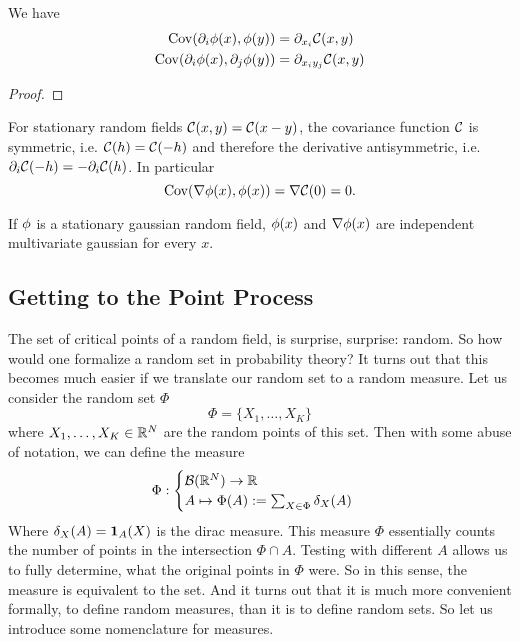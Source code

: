 \begin{lemma}
	\label{lem: covariance of derivative}
	We have
	\begin{align*}
		\operatorname{Cov}(\partial_i\phi(x), \phi(y)) &= \partial_{x_i} \mathcal{C}(x,y)\\
		\operatorname{Cov}(\partial_i\phi(x), \partial_j \phi(y)) &= \partial_{x_i y_j} \mathcal{C}(x,y)
	\end{align*}
\end{lemma}
\begin{proof}
\end{proof}
\begin{remark}\label{rem: covariance uncorrelated}
	For stationary random fields \(\mathcal{C}(x,y)=\mathcal{C}(x-y)\), the covariance
	function \(\mathcal{C}\) is symmetric, i.e. \(\mathcal{C}(h)=\mathcal{C}(-h)\)
	and therefore the derivative antisymmetric, i.e.
	\(\partial_i\mathcal{C}(-h)=-\partial_i\mathcal{C}(h)\). In particular
	\begin{equation*}
		\operatorname{Cov}(\nabla\phi(x), \phi(x)) = \nabla \mathcal{C}(0)=0.
	\end{equation*}
\end{remark}
\begin{corollary} \label{cor: uncorr leads to indep in gaussian case}
	If \(\phi\) is a stationary gaussian random field, \(\phi(x)\) and
	\(\nabla\phi(x)\) are independent multivariate gaussian for every \(x\).
\end{corollary}

\subsection{Getting to the Point Process}

The set of critical points of a random field, is surprise, surprise: random.
So how would one formalize a random set in probability theory? It turns
out that this becomes much easier if we translate our random set to a random
measure. Let us consider the random set \(\Phi\)
\[
	\Phi = \{ X_1, \dots, X_K\}
\]
where \(X_1,\dots, X_K\in\mathbb{R}^N\) are the random points of this set. Then with some
abuse of notation, we can define the measure
\[
	\Phi :
	\begin{cases}
		\mathcal{B}(\mathbb{R}^N) \to \mathbb{R} \\
		A \mapsto \Phi(A):= \sum_{X\in \Phi}\delta_X(A) 
	\end{cases}
\]
Where \(\delta_X(A)=\mathbf{1}_A(X)\) is the dirac measure. This measure \(\Phi\)
essentially counts the number of points in the intersection \(\Phi\cap A\).
Testing with different \(A\) allows us to fully determine, what
the original points in \(\Phi\) were. So in this sense, the measure is
equivalent to the set. And it turns out that it is much more convenient
formally, to define random measures, than it is to define random sets.
So let us introduce some nomenclature for measures.

